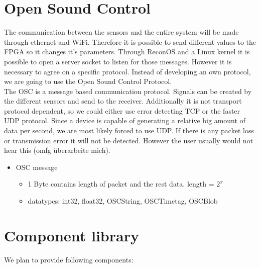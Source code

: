 \section{Open Sound Control}
The communication between the sensors and the entire system will be made through ethernet and WiFi. Therefore it is possible to send different values to the FPGA so it changes it's parameters. Through ReconOS and a Linux kernel it is possible to open a server socket to listen for those messages. However it is necessary to agree on a specific protocol. Instead of developing an own protocol, we are going to use the Open Sound Control Protocol. \\
The OSC is a message based communication protocol. Signals can be created by the different sensors and send to the receiver. Additionally it is not transport protocol dependent, so we could either use error detecting TCP or the faster UDP protocol. Since a device is capable of generating a relative big amount of data per second, we are most likely forced to use UDP. If there is any packet loss or transmission error it will not be detected. However the user usually would not hear this (omfg überarbeite mich).  
\begin{itemize}
\item{OSC message}
\begin{itemize}
\item{1 Byte contains length of packet and the rest data. length = $2^x$}
\item{datatypes: int32, float32, OSCString, OSCTimetag, OSCBlob}
\end{itemize}
\end{itemize}

\section{Component library}
We plan to provide following components:


